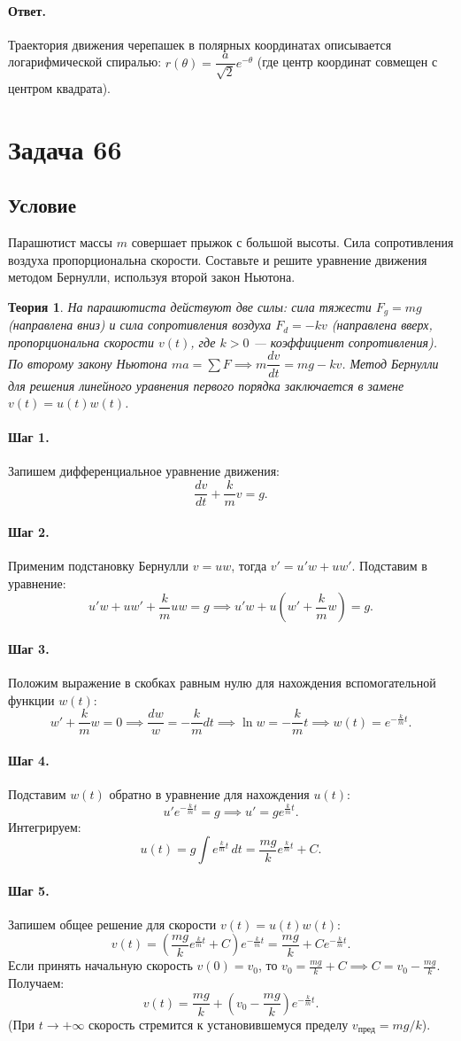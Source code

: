 \documentclass[12pt,a4paper]{article}
\theoremstyle{solution}
\newtheorem*{theory}{Теория}
\newcommand{\task}[1]{\newpage\section*{Задача #1}}
\newcommand{\answer}{\paragraph{Ответ.}}
\newcommand{\step}[1]{\paragraph{Шаг #1.}}
\begin{document}
\answer
Траектория движения черепашек в полярных координатах описывается логарифмической спиралью: $r(\theta) = \dfrac{a}{\sqrt{2}} e^{-\theta}$ (где центр координат совмещен с центром квадрата).
\task{66}
\subsection*{Условие}
Парашютист массы $m$ совершает прыжок с большой высоты. Сила сопротивления воздуха пропорциональна скорости. Составьте и решите уравнение движения методом Бернулли, используя второй закон Ньютона.

\begin{theory}
На парашютиста действуют две силы: сила тяжести $F_g = mg$ (направлена вниз) и сила сопротивления воздуха $F_d = -kv$ (направлена вверх, пропорциональна скорости $v(t)$, где $k > 0$ — коэффициент сопротивления).
По второму закону Ньютона $m a = \sum F \implies m \dfrac{dv}{dt} = mg - kv$.
Метод Бернулли для решения линейного уравнения первого порядка заключается в замене $v(t) = u(t)w(t)$.
\end{theory}

\step{1} Запишем дифференциальное уравнение движения:
\[
\frac{dv}{dt} + \frac{k}{m} v = g.
\]

\step{2} Применим подстановку Бернулли $v = uw$, тогда $v' = u'w + uw'$. Подставим в уравнение:
\[
u'w + uw' + \frac{k}{m} uw = g \implies u'w + u\left(w' + \frac{k}{m}w\right) = g.
\]

\step{3} Положим выражение в скобках равным нулю для нахождения вспомогательной функции $w(t)$:
\[
w' + \frac{k}{m}w = 0 \implies \frac{dw}{w} = -\frac{k}{m} dt \implies \ln w = -\frac{k}{m}t \implies w(t) = e^{-\frac{k}{m}t}.
\]

\step{4} Подставим $w(t)$ обратно в уравнение для нахождения $u(t)$:
\[
u' e^{-\frac{k}{m}t} = g \implies u' = g e^{\frac{k}{m}t}.
\]
Интегрируем:
\[
u(t) = g \int e^{\frac{k}{m}t}\,dt = \frac{mg}{k} e^{\frac{k}{m}t} + C.
\]

\step{5} Запишем общее решение для скорости $v(t) = u(t)w(t)$:
\[
v(t) = \left(\frac{mg}{k} e^{\frac{k}{m}t} + C\right) e^{-\frac{k}{m}t} = \frac{mg}{k} + C e^{-\frac{k}{m}t}.
\]
Если принять начальную скорость $v(0) = v_0$, то $v_0 = \frac{mg}{k} + C \implies C = v_0 - \frac{mg}{k}$. Получаем:
\[
v(t) = \frac{mg}{k} + \left(v_0 - \frac{mg}{k}\right) e^{-\frac{k}{m}t}.
\]
(При $t \to +\infty$ скорость стремится к установившемуся пределу $v_{\text{пред}} = mg/k$).
\end{document}
